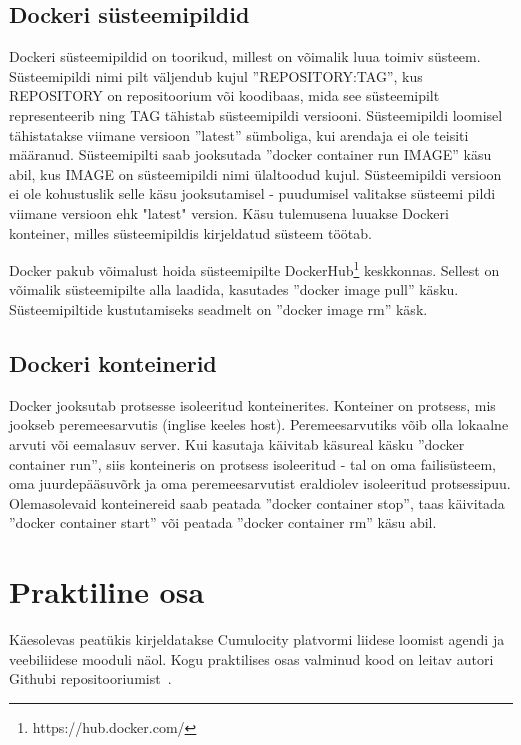 \documentclass[12pt]{article}
\begin{document}
  \subsection{Dockeri süsteemipildid}
  Dockeri süsteemipildid on toorikud, millest on võimalik luua toimiv süsteem. Süsteemipildi
  nimi pilt väljendub kujul ''REPOSITORY:TAG'', kus REPOSITORY on repositoorium või koodibaas,
  mida see süsteemipilt representeerib ning TAG tähistab süsteemipildi versiooni.
  Süsteemipildi loomisel tähistatakse viimane versioon ''latest'' sümboliga, kui arendaja ei ole
  teisiti määranud. Süsteemipilti saab jooksutada ''docker container run IMAGE'' käsu abil, kus IMAGE on
  süsteemipildi nimi ülaltoodud kujul. Süsteemipildi versioon ei ole kohustuslik selle käsu
  jooksutamisel - puudumisel valitakse süsteemi pildi viimane versioon ehk "latest" version.
  Käsu tulemusena luuakse Dockeri konteiner, milles süsteemipildis kirjeldatud süsteem töötab.
  
  Docker pakub võimalust hoida süsteemipilte DockerHub\footnote{https://hub.docker.com/} keskkonnas.
  Sellest on võimalik süsteemipilte alla laadida, kasutades ''docker image pull'' käsku. Süsteemipiltide
  kustutamiseks seadmelt on ''docker image rm'' käsk.

  \subsection{Dockeri konteinerid}
  Docker jooksutab protsesse isoleeritud konteinerites. Konteiner on protsess, mis jookseb
  peremeesarvutis (inglise keeles host). Peremeesarvutiks võib olla lokaalne arvuti või
  eemalasuv server. Kui kasutaja käivitab käsureal käsku ''docker container run'', siis konteineris
  on protsess isoleeritud - tal on oma failisüsteem, oma juurdepääsuvõrk ja oma
  peremeesarvutist eraldiolev isoleeritud protsessipuu. Olemasolevaid konteinereid saab
  peatada ''docker container stop'',
  taas käivitada ''docker container start'' 
  või peatada ''docker container rm'' käsu abil.



  \newpage
  \section{Praktiline osa}
  Käesolevas peatükis kirjeldatakse Cumulocity platvormi liidese loomist agendi ja veebiliidese
  mooduli näol. Kogu praktilises osas valminud kood on leitav autori Githubi
  repositooriumist~\cite{SolutionGithubRepository}.
 
\end{document}
